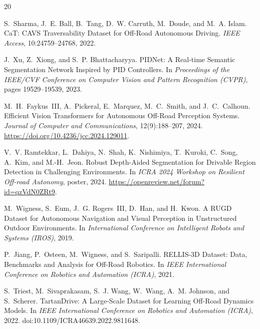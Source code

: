 \documentclass[12pt,a4paper]{report}
\begin{document}
\clearpage
{}
{}

\begin{thebibliography}{20}

S.~Sharma, J.~E. Ball, B.~Tang, D.~W. Carruth, M.~Doude, and M.~A. Islam.
\newblock CaT: CAVS Traversability Dataset for Off-Road Autonomous Driving.
\newblock \emph{IEEE Access}, 10:24759--24768, 2022.

J.~Xu, Z.~Xiong, and S.~P. Bhattacharyya.
\newblock PIDNet: A Real-time Semantic Segmentation Network Inspired by PID Controllers.
\newblock In \emph{Proceedings of the IEEE/CVF Conference on Computer Vision and Pattern Recognition (CVPR)}, pages 19529--19539, 2023.

M.~H.~Faykus~III, A.~Pickeral, E.~Marquez, M.~C.~Smith, and J.~C.~Calhoun.
\newblock Efficient Vision Transformers for Autonomous Off-Road Perception Systems.
\newblock \emph{Journal of Computer and Communications}, 12(9):188--207, 2024.
\newblock \url{https://doi.org/10.4236/jcc.2024.129011}.

V.~V. Ramtekkar, L.~Dahiya, N.~Shah, K.~Nishimiya, T.~Kuroki,
C.~Song, A.~Kim, and M.-H.~Jeon.
\newblock Robust Depth-Aided Segmentation for Drivable Region Detection in
Challenging Environments.
\newblock In \emph{ICRA 2024 Workshop on Resilient Off-road Autonomy}, poster,
2024.
\newblock \url{https://openreview.net/forum?id=qzVdN0ZRt9}.

M.~Wigness, S.~Eum, J.~G. Rogers~III, D.~Han, and H.~Kwon.
\newblock A RUGD Dataset for Autonomous Navigation and Visual Perception in Unstructured Outdoor Environments.
\newblock In \emph{International Conference on Intelligent Robots and Systems (IROS)}, 2019.

P.~Jiang, P.~Osteen, M.~Wigness, and S.~Saripalli.
\newblock RELLIS-3D Dataset: Data, Benchmarks and Analysis for Off-Road Robotics.
\newblock In \emph{IEEE International Conference on Robotics and Automation (ICRA)}, 2021.

S.~Triest, M.~Sivaprakasam, S.~J. Wang, W.~Wang, A.~M. Johnson, and S.~Scherer.
\newblock TartanDrive: A Large-Scale Dataset for Learning Off-Road Dynamics Models.
\newblock In \emph{IEEE International Conference on Robotics and Automation (ICRA)}, 2022.
\newblock doi:10.1109/ICRA46639.2022.9811648.


\end{thebibliography}
\end{document}
